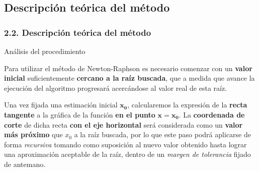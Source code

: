 \documentclass{beamer}
\begin{document}
\subsection{Descripción teórica del método}
\begin{frame}
\frametitle{2.2. Descripción teórica del método}
\begin{block}{Análisis del procedimiento}
 
Para utilizar el método de Newton-Raphson es necesario comenzar con un \textbf{valor
inicial} suficientemente \textbf{cercano a la raíz buscada}, que a medida que avance 
la ejecución del algoritmo progresará acercándose al valor real de esta raíz. \pause 

Una vez fijada una estimación inicial $\boldsymbol{x_{0}}$, calcularemos la expresión 
de la \textbf{recta tangente} a la gráfica de la función \textbf{en el punto} $\boldsymbol
{x = x_{0}}$. La \textbf{coordenada de corte} de dicha recta \textbf{con el eje horizontal}
será considerada como un \textbf{valor más próximo} que $x_{0}$ a la raíz buscada, por lo 
que este paso podrá aplicarse de forma \emph{recursiva} tomando como suposición al nuevo 
valor obtenido hasta lograr una aproximación aceptable de la raíz, dentro de un \emph{margen 
de tolerancia} fijado de antemano. 

\end{block}
\end{frame}

\end{document}
